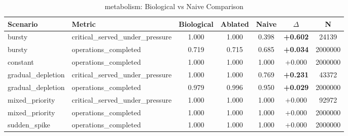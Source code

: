\begin{table}[h]
\caption{metabolism: Biological vs Naive Comparison}
\centering
\begin{tabular}{llccccc}
\toprule
Scenario & Metric & Biological & Ablated & Naive & $\Delta$ & N \\
\midrule
bursty & critical\_served\_under\_pressure & 1.000 & 1.000 & 0.398 & \textbf{+0.602} & 24139 \\
bursty & operations\_completed & 0.719 & 0.715 & 0.685 & \textbf{+0.034} & 2000000 \\
constant & operations\_completed & 1.000 & 1.000 & 1.000 & +0.000 & 2000000 \\
gradual\_depletion & critical\_served\_under\_pressure & 1.000 & 1.000 & 0.769 & \textbf{+0.231} & 43372 \\
gradual\_depletion & operations\_completed & 0.979 & 0.996 & 0.950 & \textbf{+0.029} & 2000000 \\
mixed\_priority & critical\_served\_under\_pressure & 1.000 & 1.000 & 1.000 & +0.000 & 92972 \\
mixed\_priority & operations\_completed & 1.000 & 1.000 & 1.000 & +0.000 & 2000000 \\
sudden\_spike & operations\_completed & 1.000 & 1.000 & 1.000 & +0.000 & 2000000 \\
\bottomrule
\end{tabular}
\end{table}
